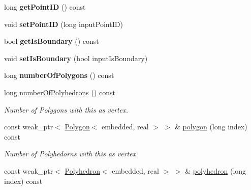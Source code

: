 \begin{DoxyCompactItemize}
\item 
long {\bfseries get\+Point\+ID} () const \hypertarget{class_mesh_point_ab373939208adf6f3a6720337b72ab4df}{}\label{class_mesh_point_ab373939208adf6f3a6720337b72ab4df}

\item 
void {\bfseries set\+Point\+ID} (long input\+Point\+ID)\hypertarget{class_mesh_point_a9fb3ec58099e4e711643cc0fae370f79}{}\label{class_mesh_point_a9fb3ec58099e4e711643cc0fae370f79}

\item 
bool {\bfseries get\+Is\+Boundary} () const \hypertarget{class_mesh_point_a53fc7a6ea17475aafeec206c9de3edd8}{}\label{class_mesh_point_a53fc7a6ea17475aafeec206c9de3edd8}

\item 
void {\bfseries set\+Is\+Boundary} (bool input\+Is\+Boundary)\hypertarget{class_mesh_point_a2c0fb6d2c9eea8ff733c694eead116bc}{}\label{class_mesh_point_a2c0fb6d2c9eea8ff733c694eead116bc}

\item 
long {\bfseries number\+Of\+Polygons} () const \hypertarget{class_mesh_point_a05dd421cf0eb43450b5b36e6460004b6}{}\label{class_mesh_point_a05dd421cf0eb43450b5b36e6460004b6}

\item 
long \hyperlink{class_mesh_point_a42eaf370ee97316363f183b2ed2fea30}{number\+Of\+Polyhedrons} () const \hypertarget{class_mesh_point_a42eaf370ee97316363f183b2ed2fea30}{}\label{class_mesh_point_a42eaf370ee97316363f183b2ed2fea30}

\begin{DoxyCompactList}\small\item\em Number of Polygons with this as vertex. \end{DoxyCompactList}\item 
const weak\+\_\+ptr$<$ \hyperlink{class_polygon}{Polygon}$<$ embedded, real $>$ $>$ \& \hyperlink{class_mesh_point_afccab1b0b35b3823a69f2cc90cc6a043}{polygon} (long index) const \hypertarget{class_mesh_point_afccab1b0b35b3823a69f2cc90cc6a043}{}\label{class_mesh_point_afccab1b0b35b3823a69f2cc90cc6a043}

\begin{DoxyCompactList}\small\item\em Number of Polyhedorns with this as vertex. \end{DoxyCompactList}\item 
const weak\+\_\+ptr$<$ \hyperlink{class_polyhedron}{Polyhedron}$<$ embedded, real $>$ $>$ \& \hyperlink{class_mesh_point_a7bca0a9727c94dad3d9fef2aac8e310b}{polyhedron} (long index) const \hypertarget{class_mesh_point_a7bca0a9727c94dad3d9fef2aac8e310b}{}\label{class_mesh_point_a7bca0a9727c94dad3d9fef2aac8e310b}


\end{DoxyCompactItemize}
